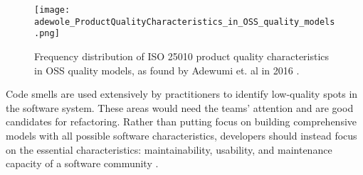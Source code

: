 \begin{figure}[ht]
  \centerline{
      \texttt{[image: adewole\_ProductQualityCharacteristics\_in\_OSS\_quality\_models.png]}
  }
  \caption{Frequency distribution of ISO 25010 product quality characteristics in OSS quality models, as found by Adewumi et. al in 2016 \cite{adewumi:2016}.}
  \label{figFreqDistProductQualityModel}
\end{figure}

Code smells are used extensively by practitioners to identify low-quality spots in the software system. These areas would need the teams' attention and are good candidates for refactoring. Rather than putting focus on building comprehensive models with all possible software characteristics, developers should instead focus on the essential characteristics: maintainability, usability, and maintenance capacity of a software community \cite{adewumi:2016}.

